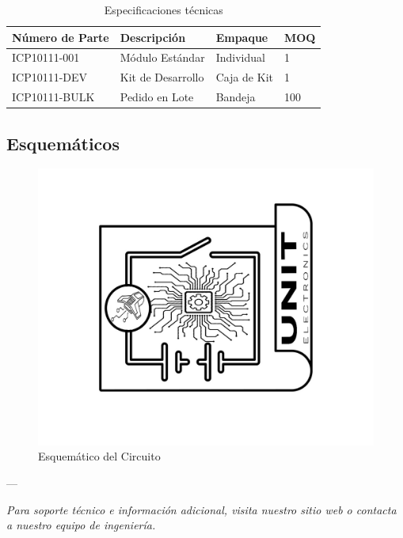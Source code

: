 \documentclass[11pt,a4paper]{article}
\begin{document}
\begin{table}[H]
\centering
\small
\begin{tabular}{|l|l|l|l|}
\hline
Número de Parte & Descripción & Empaque & MOQ \\
\hline
ICP10111-001 & Módulo Estándar & Individual & 1 \\
ICP10111-DEV & Kit de Desarrollo & Caja de Kit & 1 \\
ICP10111-BULK & Pedido en Lote & Bandeja & 100 \\
\hline
\end{tabular}
\caption{Especificaciones técnicas}
\end{table}


\subsection{Esquemáticos}


\begin{figure}[H]
\centering
\includegraphics[width=\textwidth]{es_Schematics_icon.jpg}
\caption{Esquemático del Circuito}
\label{fig:es-Schematics-icon-jpg}
\end{figure}



---

\textit{Para soporte técnico e información adicional, visita nuestro sitio web o contacta a nuestro equipo de ingeniería.}
\end{document}
